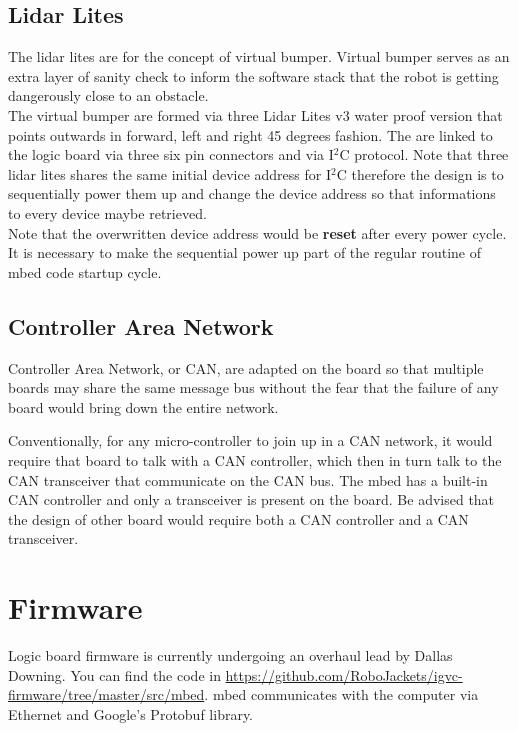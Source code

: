 \documentclass[letterpaper, 12pt]{article}
\begin{document}
\subsection{Lidar Lites}

The lidar lites are for the concept of virtual bumper. Virtual bumper serves as an extra layer of sanity check to inform
the software stack that the robot is getting dangerously close to an obstacle. \\

The virtual bumper are formed via three Lidar Lites v3 water proof version that points outwards in forward, left and right 45 degrees fashion.
The are linked to the logic board via three six pin connectors and via I$^2$C protocol. Note that three lidar lites shares the same initial 
device address for I$^2$C therefore the design is to sequentially power them up and change the device address so that informations to every device
maybe retrieved. \\

Note that the overwritten device address would be \textbf{reset} after every power cycle. It is necessary to make the sequential power up part of the
regular routine of mbed code startup cycle. 

\subsection{Controller Area Network}

Controller Area Network, or CAN, are adapted on the board so that multiple boards may share the same message bus without the fear that the failure
of any board would bring down the entire network. 

Conventionally, for any micro-controller to join up in a CAN network, it would require that board to talk with a CAN controller, which then in turn
talk to the CAN transceiver that communicate on the CAN bus. The mbed has a built-in CAN controller and only a transceiver is present on the board. 
Be advised that the design of other board would require both a CAN controller and a CAN transceiver. 

\pagebreak

\section{Firmware}
Logic board firmware is currently undergoing an overhaul lead by Dallas Downing. You can find the code in 
\url{https://github.com/RoboJackets/igvc-firmware/tree/master/src/mbed}. mbed communicates with the computer via Ethernet
and Google's Protobuf library. 
\end{document}
